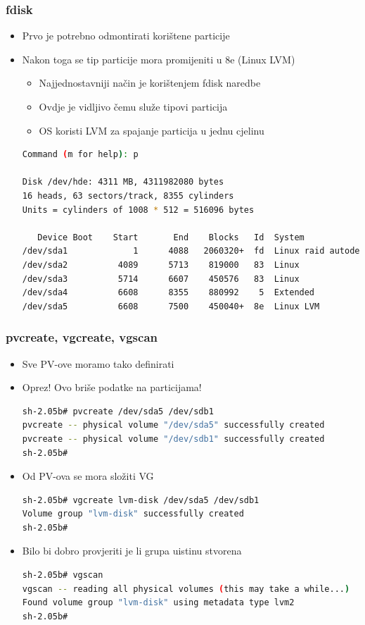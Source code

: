 \documentclass[croatian,t]{beamer} %
\begin{document}
	\begin{frame}[fragile]
	\frametitle{fdisk}
		\begin{itemize}
			\item Prvo je potrebno odmontirati korištene particije
			\item Nakon toga se tip particije mora promijeniti u 8e (Linux LVM)
			\begin{itemize}
				\item Najjednostavniji način je korištenjem fdisk naredbe			
			\end{itemize}
			\begin{itemize}
				\item Ovdje je vidljivo čemu služe tipovi particija
				\item OS koristi LVM za spajanje particija u jednu cjelinu
			\end{itemize}
		\begin{lstlisting}[basicstyle={\tiny\ttfamily},language=bash]
Command (m for help): p
 
Disk /dev/hde: 4311 MB, 4311982080 bytes
16 heads, 63 sectors/track, 8355 cylinders
Units = cylinders of 1008 * 512 = 516096 bytes
 
   Device Boot    Start       End    Blocks   Id  System
/dev/sda1             1      4088   2060320+  fd  Linux raid autodetect
/dev/sda2          4089      5713    819000   83  Linux
/dev/sda3          5714      6607    450576   83  Linux
/dev/sda4          6608      8355    880992    5  Extended
/dev/sda5          6608      7500    450040+  8e  Linux LVM
		\end{lstlisting}		
		\end{itemize}
	\end{frame}	
	
	\begin{frame}[fragile]
	\frametitle{pvcreate, vgcreate, vgscan}
		\begin{itemize}
			\item Sve PV-ove moramo tako definirati
			\item Oprez! Ovo briše podatke na particijama!
			\begin{lstlisting}[basicstyle={\tiny\ttfamily},language=bash]
sh-2.05b# pvcreate /dev/sda5 /dev/sdb1
pvcreate -- physical volume "/dev/sda5" successfully created
pvcreate -- physical volume "/dev/sdb1" successfully created
sh-2.05b#
			\end{lstlisting}
			\item Od PV-ova se mora složiti VG
			\begin{lstlisting}[basicstyle={\tiny\ttfamily},language=bash]
sh-2.05b# vgcreate lvm-disk /dev/sda5 /dev/sdb1
Volume group "lvm-disk" successfully created
sh-2.05b#
			\end{lstlisting}
			\item Bilo bi dobro provjeriti je li grupa uistinu stvorena
			\begin{lstlisting}[basicstyle={\tiny\ttfamily},language=bash]
sh-2.05b# vgscan
vgscan -- reading all physical volumes (this may take a while...)
Found volume group "lvm-disk" using metadata type lvm2
sh-2.05b#
			\end{lstlisting}
		\end{itemize}
	\end{frame}
	
\end{document}
